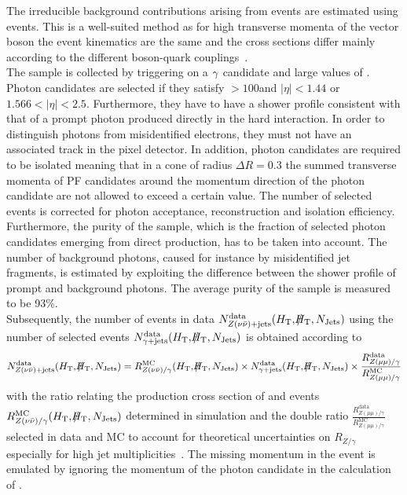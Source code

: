The irreducible background contributions arising from \ZInvJets events are estimated using \photonJets events. This is a well-suited method as for high transverse momenta of the vector boson the event kinematics are the same and the cross sections differ mainly according to the different boson-quark couplings~\cite{Ask:2011xf, Bern:2011pa, Bern:2012vx}. \\
The \photonJets sample is collected by triggering on a $\gamma$ candidate and large values of \HT. Photon candidates are selected if they satisfy \pt$ > 100$\gev and $|\eta| < 1.44$ or $1.566 < |\eta| < 2.5$. Furthermore, they have to have a shower profile consistent with that of a prompt photon produced directly in the hard interaction. In order to distinguish photons from misidentified electrons, they must not have an associated track in the pixel detector. In addition, photon candidates are required to be isolated meaning that in a cone of radius $\Delta R = 0.3$ the summed transverse momenta of PF candidates around the momentum direction of the photon candidate are not allowed to exceed a certain value. The number of selected \photonJets events is corrected for photon acceptance, reconstruction and isolation efficiency. Furthermore, the purity of the \photonJets sample, which is the fraction of selected photon candidates emerging from direct production, has to be taken into account. The number of background photons, caused for instance by misidentified jet fragments, is estimated by exploiting the difference between the shower profile of prompt and background photons. The average purity of the \photonJets sample is measured to be 93\%. \\
Subsequently, the number of \ZInvJets events in data $N_{Z(\nu\bar{\nu})+\text{jets}}^{\text{data}} (H_{\text{T}}, \slash\mkern-12mu{H}_{\text{T}}, N_{\text{Jets}})$ using the number of selected \photonJets events $N_{\gamma+\text{jets}}^{\text{data}} (H_{\text{T}},\slash\mkern-12mu{H}_{\text{T}},N_{\text{Jets}})$ is obtained according to
\begin{equation*}
N_{\ZInvJets}^{\text{data}} (\HT, \MHT, \NJets) = R^{\text{MC}}_{Z(\nu\bar{\nu})/\gamma} (\HT,\MHT,\NJets)
                                                        \times 
                                                       N_{\photonJets}^{\text{data}} (\HT,\MHT,\NJets)
                                                       \times 
                                                       \frac{R_{Z(\mu\mu)/\gamma}^{\text{data}}}{R_{Z(\mu\mu)/\gamma}^{\text{MC}}}
\label{eqn:photoncorr}
\end{equation*}
with the ratio relating the production cross section of \ZInvJets and \photonJets events $R^{\text{MC}}_{Z(\nu\bar{\nu})/\gamma} (H_{\text{T}},\slash\mkern-12mu{H}_{\text{T}},N_{\text{Jets}})$ determined in simulation and the double ratio $\frac{R_{Z(\mu\mu)/\gamma}^{\text{data}}}{R_{Z(\mu\mu)/\gamma}^{\text{MC}}}$ selected in data and MC to account for theoretical uncertainties on $R_{Z/\gamma}$ especially for high jet multiplicities~\cite{Bern:2011pa, Bern:2012vx}. The missing momentum in the event is emulated by ignoring the momentum of the photon candidate in the calculation of \MHT. \\
